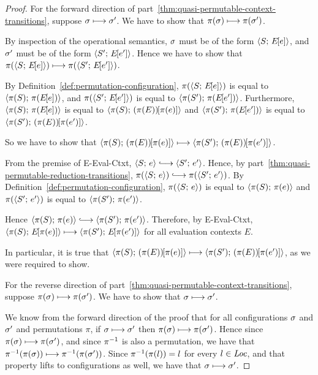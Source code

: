\begin{proof}

  For the forward direction of
  part~\ref{thm:quasi-permutable-context-transitions}, suppose $\sigma
  \longmapsto \sigma'$.  We have to show that $\pi(\sigma) \longmapsto
  \pi(\sigma')$.

  By inspection of the operational semantics, $\sigma$ must be of the
  form $\langle S;\, E\hspace{-1mm}\left[e\right] \rangle$, and $\sigma'$ must be of the form
  $\langle S';\, E\hspace{-1mm}\left[e'\right] \rangle$.  Hence we have to show that
  $\pi(\langle S;\, E\hspace{-1mm}\left[e\right] \rangle) \longmapsto \pi(\langle S';\, E\hspace{-1mm}\left[e'\right] \rangle)$.

  By Definition~\ref{def:permutation-configuration},
  $\pi(\langle S;\, E\hspace{-1mm}\left[e\right] \rangle)$ is equal to $\langle \pi(S);\, \pi(E\hspace{-1mm}\left[e\right]) \rangle$,
  and $\pi(\langle S';\, E\hspace{-1mm}\left[e'\right] \rangle)$ is equal to
  $\langle \pi(S');\, \pi(E\hspace{-1mm}\left[e'\right]) \rangle$.  Furthermore,
  $\langle \pi(S);\, \pi(E\hspace{-1mm}\left[e\right]) \rangle$ is equal to
  $\langle \pi(S);\, (\pi(E))\hspace{-1mm}\left[\pi(e)\right] \rangle$ and
  $\langle \pi(S');\, \pi(E\hspace{-1mm}\left[e'\right]) \rangle$ is equal to
  $\langle \pi(S');\, (\pi(E))\hspace{-1mm}\left[\pi(e')\right] \rangle$.

  So we have to show that
  $\langle \pi(S);\, (\pi(E))\hspace{-1mm}\left[\pi(e)\right] \rangle \longmapsto
  \langle \pi(S');\, (\pi(E))\hspace{-1mm}\left[\pi(e')\right] \rangle$.

  From the premise of {\sc E-Eval-Ctxt}, $\config{S}{e} \parstepsto
  \config{S'}{e'}$.  Hence, by
  part~\ref{thm:quasi-permutable-reduction-transitions},
  $\pi(\config{S}{e}) \parstepsto \pi(\config{S'}{e'})$.  By
  Definition~\ref{def:permutation-configuration}, $\pi(\langle S;\, e \rangle)$
  is equal to $\langle \pi(S);\, \pi(e) \rangle$ and $\pi(\langle S';\, e' \rangle)$ is
  equal to $\langle \pi(S');\, \pi(e') \rangle$.

  Hence $\config{\pi(S)}{\pi(e)} \parstepsto
  \config{\pi(S')}{\pi(e')}$.  Therefore, by {\sc E-Eval-Ctxt},
  $\langle \pi(S);\, E\hspace{-1mm}\left[\pi(e)\right] \rangle \longmapsto
  \langle \pi(S');\, E\hspace{-1mm}\left[\pi(e')\right] \rangle$ for all evaluation contexts $E$.

  In particular, it is true that
  $\langle \pi(S);\, (\pi(E))\hspace{-1mm}\left[\pi(e)\right] \rangle \longmapsto
  \langle \pi(S');\, (\pi(E))\hspace{-1mm}\left[\pi(e')\right] \rangle$, as we were required
  to show.

  For the reverse direction of
  part~\ref{thm:quasi-permutable-context-transitions}, suppose
  $\pi(\sigma) \longmapsto \pi(\sigma')$.  We have to show that $\sigma
  \longmapsto \sigma'$.

  We know from the forward direction of the proof that for all
  configurations $\sigma$ and $\sigma'$ and permutations $\pi$, if
  $\sigma \longmapsto \sigma'$ then $\pi(\sigma) \longmapsto
  \pi(\sigma')$.  Hence since $\pi(\sigma) \longmapsto \pi(\sigma')$, and
  since $\pi^{-1}$ is also a permutation, we have that
  $\pi^{-1}(\pi(\sigma)) \longmapsto \pi^{-1}(\pi(\sigma'))$.  Since
  $\pi^{-1}(\pi(l)) = l$ for every $l \in \mathit{Loc}$, and that property lifts
  to configurations as well, we have that $\sigma \longmapsto \sigma'$.

\end{proof}
